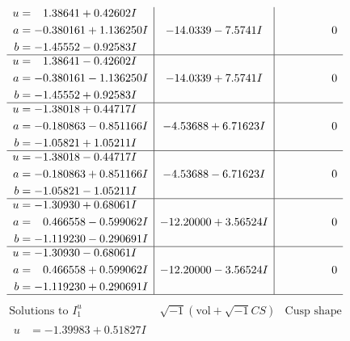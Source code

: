 \documentclass[1p]{elsarticle_modified}
\theoremstyle{definition}
\newcommand{\I}{\sqrt{-1}}
\begin{document}
$$\begin{array}{c|c|c}
\begin{aligned}
u &= \phantom{-}1.38641 + 0.42602 I \\
a &= -0.380161 + 1.136250 I \\
b &= -1.45552 - 0.92583 I\end{aligned}
 & -14.0339 - 7.5741 I & \phantom{-0.000000 } 0 \\ \hline\begin{aligned}
u &= \phantom{-}1.38641 - 0.42602 I \\
a &= -0.380161 - 1.136250 I \\
b &= -1.45552 + 0.92583 I\end{aligned}
 & -14.0339 + 7.5741 I & \phantom{-0.000000 } 0 \\ \hline\begin{aligned}
u &= -1.38018 + 0.44717 I \\
a &= -0.180863 - 0.851166 I \\
b &= -1.05821 + 1.05211 I\end{aligned}
 & -4.53688 + 6.71623 I & \phantom{-0.000000 } 0 \\ \hline\begin{aligned}
u &= -1.38018 - 0.44717 I \\
a &= -0.180863 + 0.851166 I \\
b &= -1.05821 - 1.05211 I\end{aligned}
 & -4.53688 - 6.71623 I & \phantom{-0.000000 } 0 \\ \hline\begin{aligned}
u &= -1.30930 + 0.68061 I \\
a &= \phantom{-}0.466558 - 0.599062 I \\
b &= -1.119230 - 0.290691 I\end{aligned}
 & -12.20000 + 3.56524 I & \phantom{-0.000000 } 0 \\ \hline\begin{aligned}
u &= -1.30930 - 0.68061 I \\
a &= \phantom{-}0.466558 + 0.599062 I \\
b &= -1.119230 + 0.290691 I\end{aligned}
 & -12.20000 - 3.56524 I & \phantom{-0.000000 } 0\\
 \hline 
 \end{array}$$\newpage$$\begin{array}{c|c|c}  
\text{Solutions to }I^u_{1}& \I (\text{vol} + \sqrt{-1}CS) & \text{Cusp shape}\\
 \hline 
\begin{aligned}
u &= -1.39983 + 0.51827 I \\

\end{aligned}
\end{array}$$
\end{document}
